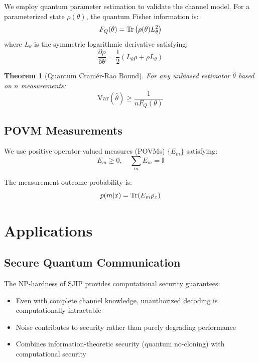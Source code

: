 \documentclass[12pt,a4paper]{article}
\newtheorem{theorem}{Theorem}[section]
\begin{document}
We employ quantum parameter estimation to validate the channel model. For a parameterized state $\rho(\theta)$, the quantum Fisher information is:
\begin{equation}
F_Q(\theta) = \Tr\left(\rho(\theta) L_\theta^2\right)
\end{equation}
where $L_\theta$ is the symmetric logarithmic derivative satisfying:
\begin{equation}
\frac{\partial \rho}{\partial \theta} = \frac{1}{2}\left(L_\theta \rho + \rho L_\theta\right)
\end{equation}

\begin{theorem}[Quantum Cramér-Rao Bound]
For any unbiased estimator $\hat{\theta}$ based on $n$ measurements:
\begin{equation}
\text{Var}(\hat{\theta}) \geq \frac{1}{n F_Q(\theta)}
\end{equation}
\end{theorem}

\subsection{POVM Measurements}

We use positive operator-valued measures (POVMs) $\{E_m\}$ satisfying:
\begin{equation}
E_m \geq 0, \quad \sum_m E_m = \mathbb{I}
\end{equation}

The measurement outcome probability is:
\begin{equation}
p(m|x) = \Tr(E_m \rho_x)
\end{equation}

\section{Applications}

\subsection{Secure Quantum Communication}

The NP-hardness of SJIP provides computational security guarantees:
\begin{itemize}
\item Even with complete channel knowledge, unauthorized decoding is computationally intractable
\item Noise contributes to security rather than purely degrading performance
\item Combines information-theoretic security (quantum no-cloning) with computational security
\end{itemize}
\end{document}
